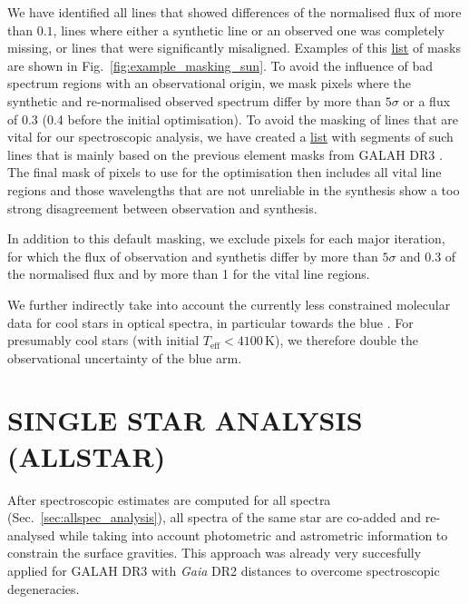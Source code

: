 \documentclass[
  journal=pasa,
  manuscript=research-paper, %
  year=2023,
  volume=37
]{cup-journal}
\newcommand{\Gaia}{\textit{Gaia}\xspace}
\begin{document}
We have identified all lines that showed differences of the normalised flux of more than $0.1$, lines where either a synthetic line or an observed one was completely missing, or lines that were significantly misaligned. Examples of this \href{https://github.com/svenbuder/GALAH_DR4/blob/main/spectrum_analysis/spectrum_masks/solar_spectrum_mask.fits}{list} of masks are shown in Fig.~\ref{fig:example_masking_sun}. To avoid the influence of bad spectrum regions with an observational origin, we mask pixels where the synthetic and re-normalised observed spectrum differ by more than $5\sigma$ or a flux of 0.3 (0.4 before the initial optimisation). To avoid the masking of lines that are vital for our spectroscopic analysis, we have created a \href{https://github.com/svenbuder/GALAH_DR4/blob/main/spectrum_analysis/spectrum_masks/vital_lines.fits}{list} with segments of such lines that is mainly based on the previous element masks from GALAH DR3 \citep{Buder2021}. The final mask of pixels to use for the optimisation then includes all vital line regions and those wavelengths that are not unreliable in the synthesis show a too strong disagreement between observation and synthesis.

In addition to this default masking, we exclude pixels for each major iteration, for which the flux of observation and synthetis differ by more than $5 \sigma$ and 0.3 of the normalised flux and by more than 1 for the vital line regions.

We further indirectly take into account the currently less constrained molecular data for cool stars in optical spectra, in particular towards the blue \citep[e.g.][]{Rains2021}. For presumably cool stars (with initial $T_\text{eff} < 4100\,\mathrm{K}$), we therefore double the observational uncertainty of the blue arm.

\section{SINGLE STAR ANALYSIS (ALLSTAR)}
\label{sec:allstar_analysis}

After spectroscopic estimates are computed for all spectra (Sec.~\ref{sec:allspec_analysis}), all spectra of the same star are co-added and re-analysed while taking into account photometric and astrometric information to constrain the surface gravities. This approach was already very succesfully applied for GALAH DR3 \citep{Buder2021} with \Gaia DR2 distances \citep{BailerJones2018} to overcome spectroscopic degeneracies.
\end{document}
